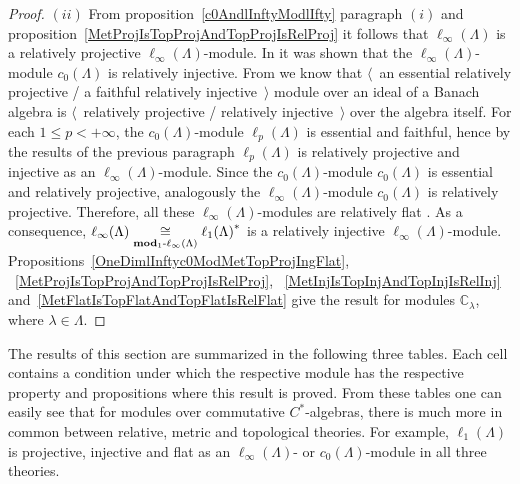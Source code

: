\begin{proof}
$(ii)$ From proposition~\ref{c0AndlInftyModlIfty} paragraph $(i)$ and
proposition~\ref{MetProjIsTopProjAndTopProjIsRelProj} it follows that
$\ell_\infty(\Lambda)$ is a relatively projective $\ell_\infty(\Lambda)$-module. 
In \cite[theorem 4.4]{NemANoteOnRelInjC0ModC0} it was shown 
that the $\ell_\infty(\Lambda)$-module $c_0(\Lambda)$ is relatively injective. 
From \cite[propositions 2.3.3, 2.3.4]{RamsHomPropSemgroupAlg} we know that
$\langle$~an essential relatively projective / a faithful relatively
injective~$\rangle$ module over an ideal of a Banach algebra is 
$\langle$~relatively projective / relatively injective~$\rangle$ over the algebra 
itself. For each $1\leq p<+\infty$, the $c_0(\Lambda)$-module $\ell_p(\Lambda)$  
is essential and faithful, hence by the results of 
the previous paragraph $\ell_p(\Lambda)$ is relatively projective and
injective as an $\ell_\infty(\Lambda)$-module. Since the $c_0(\Lambda)$-module 
$c_0(\Lambda)$ is essential and relatively projective, analogously 
the $\ell_\infty(\Lambda)$-module $c_0(\Lambda)$ is relatively projective. 
Therefore, all these $\ell_\infty(\Lambda)$-modules are relatively 
flat \cite[proposition 7.1.40]{HelBanLocConvAlg}. As a consequence, 
$\ell_\infty(\Lambda)\mathrel{\mathop{\cong}\limits_{\mathbf{mod}_1\text{-}\ell_\infty(\Lambda)}} {\ell_1(\Lambda)}^*$ 
is a relatively injective $\ell_\infty(\Lambda)$-module.
Propositions~\ref{OneDimlInftyc0ModMetTopProjIngFlat},
~\ref{MetProjIsTopProjAndTopProjIsRelProj},
~\ref{MetInjIsTopInjAndTopInjIsRelInj}
and~\ref{MetFlatIsTopFlatAndTopFlatIsRelFlat} give the result for modules
$\mathbb{C}_\lambda$, where $\lambda\in\Lambda$.
\end{proof}

The results of this section are summarized in the following three tables. Each cell
contains a condition under which the respective module has the respective
property and propositions where this result is proved.
From these tables one can easily see that for modules over commutative
$C^*$-algebras, there is much more in common between relative, metric and
topological theories. For example, $\ell_1(\Lambda)$ is projective, injective and
flat as an $\ell_\infty(\Lambda)$- or $c_0(\Lambda)$-module in all three theories.


